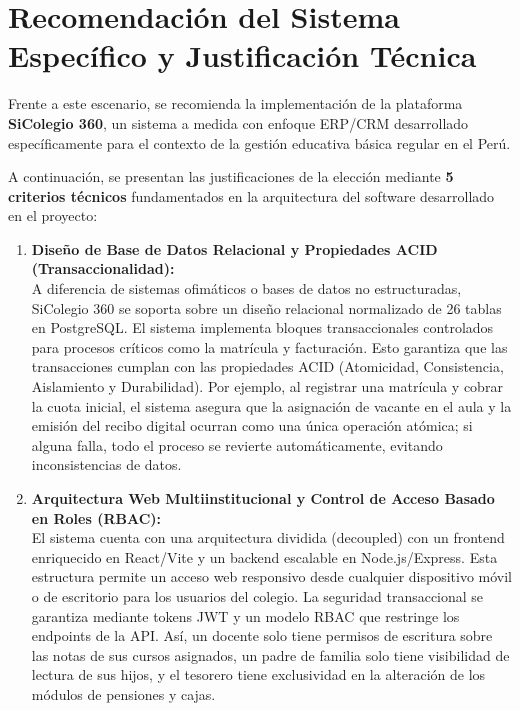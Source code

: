 \documentclass[12pt,a4paper,oneside]{report}
\begin{document}
\newpage

\section{Recomendación del Sistema Específico y Justificación Técnica}

Frente a este escenario, se recomienda la implementación de la plataforma \textbf{SiColegio 360}, un sistema a medida con enfoque ERP/CRM desarrollado específicamente para el contexto de la gestión educativa básica regular en el Perú. 

A continuación, se presentan las justificaciones de la elección mediante \textbf{5 criterios técnicos} fundamentados en la arquitectura del software desarrollado en el proyecto:

\begin{enumerate}
    \item \textbf{Diseño de Base de Datos Relacional y Propiedades ACID (Transaccionalidad):} \\
    A diferencia de sistemas ofimáticos o bases de datos no estructuradas, SiColegio 360 se soporta sobre un diseño relacional normalizado de 26 tablas en PostgreSQL. El sistema implementa bloques transaccionales controlados para procesos críticos como la matrícula y facturación. Esto garantiza que las transacciones cumplan con las propiedades ACID (Atomicidad, Consistencia, Aislamiento y Durabilidad). Por ejemplo, al registrar una matrícula y cobrar la cuota inicial, el sistema asegura que la asignación de vacante en el aula y la emisión del recibo digital ocurran como una única operación atómica; si alguna falla, todo el proceso se revierte automáticamente, evitando inconsistencias de datos.
    
    \item \textbf{Arquitectura Web Multiinstitucional y Control de Acceso Basado en Roles (RBAC):} \\
    El sistema cuenta con una arquitectura dividida (decoupled) con un frontend enriquecido en React/Vite y un backend escalable en Node.js/Express. Esta estructura permite un acceso web responsivo desde cualquier dispositivo móvil o de escritorio para los usuarios del colegio. La seguridad transaccional se garantiza mediante tokens JWT y un modelo RBAC que restringe los endpoints de la API. Así, un docente solo tiene permisos de escritura sobre las notas de sus cursos asignados, un padre de familia solo tiene visibilidad de lectura de sus hijos, y el tesorero tiene exclusividad en la alteración de los módulos de pensiones y cajas.
    

\end{enumerate}
\end{document}
